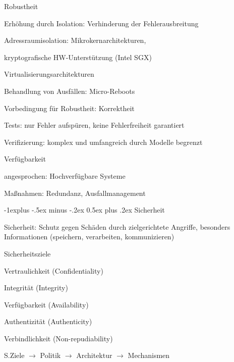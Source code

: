 \documentclass[a4paper]{article}
\makeatletter
\renewcommand{\subsection}{\@startsection{subsection}{2}{0mm}%
 {-1explus -.5ex minus -.2ex}%
 {0.5ex plus .2ex}%
 {\normalfont\normalsize\bfseries}}
\makeatother
\begin{document}
\begin{multicols}{3}
    Robustheit
    \begin{itemize*}
        \item Erhöhung durch Isolation: Verhinderung der Fehlerausbreitung
        \begin{enumerate*}
            \item Adressraumisolation: Mikrokernarchitekturen,
            \item kryptografische HW-Unterstützung (Intel SGX)
            \item Virtualisierungsarchitekturen
        \end{enumerate*}
        \item Behandlung von Ausfällen: Micro-Reboots
    \end{itemize*}

    Vorbedingung für Robustheit: Korrektheit
    \begin{enumerate*}
        \item Tests: nur Fehler aufspüren, keine Fehlerfreiheit garantiert
        \item Verifizierung: komplex und umfangreich durch Modelle begrenzt
    \end{enumerate*}

    Verfügbarkeit
    \begin{itemize*}
        \item angesprochen: Hochverfügbare Systeme
        \item Maßnahmen: Redundanz, Ausfallmanagement
    \end{itemize*}

    \subsection{Sicherheit}
    \begin{itemize*}
        \item Sicherheit: Schutz gegen Schäden durch zielgerichtete Angriffe, besonders Informationen (speichern, verarbeiten, kommunizieren)
        \item Sicherheitsziele
        \begin{enumerate*}
            \item Vertraulichkeit (Confidentiality)
            \item Integrität (Integrity)
            \item Verfügbarkeit (Availability)
            \item Authentizität (Authenticity)
            \item Verbindlichkeit (Non-repudiability)
        \end{enumerate*}
        \item S.Ziele $\rightarrow$ Politik $\rightarrow$ Architektur $\rightarrow$ Mechanismen
    \end{itemize*}


\end{multicols}
\end{document}
